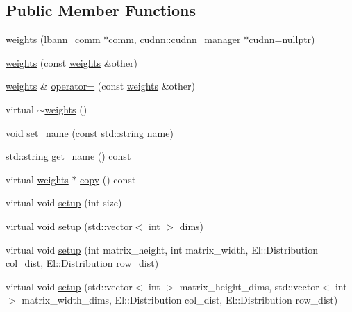 \subsection*{Public Member Functions}
\begin{DoxyCompactItemize}
\item 
\hyperlink{classlbann_1_1weights_a21a3a3f1806197d10619a1450871e066}{weights} (\hyperlink{classlbann_1_1lbann__comm}{lbann\+\_\+comm} $\ast$\hyperlink{file__io_8cpp_ab048c6f9fcbcfaa57ce68b00263dbebe}{comm}, \hyperlink{classlbann_1_1cudnn_1_1cudnn__manager}{cudnn\+::cudnn\+\_\+manager} $\ast$cudnn=nullptr)
\item 
\hyperlink{classlbann_1_1weights_ab7cca67d4459f3ba6a72dae4bb8d5cc6}{weights} (const \hyperlink{classlbann_1_1weights}{weights} \&other)
\item 
\hyperlink{classlbann_1_1weights}{weights} \& \hyperlink{classlbann_1_1weights_ac1021a88dc4efe5f91a40fae223edf4b}{operator=} (const \hyperlink{classlbann_1_1weights}{weights} \&other)
\item 
virtual \hyperlink{classlbann_1_1weights_a82334405491bee7a2e2a1295dcb94134}{$\sim$weights} ()
\item 
void \hyperlink{classlbann_1_1weights_ab886e4d3ff62b62a7ac6c52e391666f2}{set\+\_\+name} (const std\+::string name)
\item 
std\+::string \hyperlink{classlbann_1_1weights_a272f80766f31a5add7a970e5e8fcc352}{get\+\_\+name} () const
\item 
virtual \hyperlink{classlbann_1_1weights}{weights} $\ast$ \hyperlink{classlbann_1_1weights_a1a85fa681dcac2dbead2e5012099f380}{copy} () const
\item 
virtual void \hyperlink{classlbann_1_1weights_a476989a30cbe62ab2f680235981c3ba5}{setup} (int size)
\item 
virtual void \hyperlink{classlbann_1_1weights_a64037919e22272a8931da328f0b2494a}{setup} (std\+::vector$<$ int $>$ dims)
\item 
virtual void \hyperlink{classlbann_1_1weights_aacf5c30b815e2f1c47a33043e440ed65}{setup} (int matrix\+\_\+height, int matrix\+\_\+width, El\+::\+Distribution col\+\_\+dist, El\+::\+Distribution row\+\_\+dist)
\item 
virtual void \hyperlink{classlbann_1_1weights_a32a8395709a5238ca93d4b4f102cdc12}{setup} (std\+::vector$<$ int $>$ matrix\+\_\+height\+\_\+dims, std\+::vector$<$ int $>$ matrix\+\_\+width\+\_\+dims, El\+::\+Distribution col\+\_\+dist, El\+::\+Distribution row\+\_\+dist)
\item 

\end{DoxyCompactItemize}
